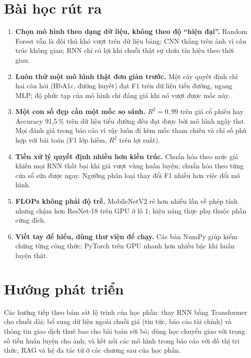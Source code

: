 \section*{Bài học rút ra}

\begin{enumerate}
  \item \textbf{Chọn mô hình theo dạng dữ liệu, không theo độ “hiện đại”.} Random Forest vẫn là đối thủ khó vượt trên dữ liệu
    bảng; CNN thắng trên ảnh vì cấu trúc không gian; RNN chỉ có lợi khi chuỗi thật sự chứa tín hiệu theo thời gian.
  \item \textbf{Luôn thử một mô hình thật đơn giản trước.} Một cây quyết định chỉ hai câu hỏi (HbA1c, đường huyết) đạt F1
     trên dữ liệu tiểu đường, ngang MLP; độ phức tạp của mô hình chỉ đáng giá khi nó vượt được mốc này.
  \item \textbf{Một con số đẹp cần một mốc so sánh.} $R^2 = 0{,}99$ trên giá cổ phiếu hay Accuracy 91,5\,\% trên dữ liệu tiểu
    đường đều đạt được bởi mô hình ngây thơ. Mọi đánh giá trong báo cáo vì vậy luôn đi kèm mốc tham chiếu và chỉ số phù hợp
    với bài toán (F1 lớp hiếm, $R^2$ trên lợi suất).
  \item \textbf{Tiền xử lý quyết định nhiều hơn kiến trúc.} Chuẩn hóa theo mức giá khiến mọi RNN thất bại khi giá vượt vùng
    huấn luyện; chuẩn hóa theo từng cửa sổ sửa được ngay. Ngưỡng phân loại thay đổi F1 nhiều hơn việc đổi mô hình.
  \item \textbf{FLOPs không phải độ trễ.} MobileNetV2 rẻ hơn nhiều lần về phép tính nhưng chậm hơn ResNet-18 trên GPU ở lô 1;
    hiệu năng thực phụ thuộc phần cứng đích.
  \item \textbf{Viết tay để hiểu, dùng thư viện để chạy.} Các bản NumPy giúp kiểm chứng từng công thức; PyTorch trên GPU nhanh
    hơn nhiều bậc khi huấn luyện thật.
\end{enumerate}

\section*{Hướng phát triển}

Các hướng tiếp theo bám sát lộ trình của học phần: thay RNN bằng Transformer cho chuỗi dài; bổ sung dữ liệu ngoài chuỗi giá
(tin tức, báo cáo tài chính) và thông tin giao dịch thuê bao cho bài toán rời bỏ; dùng học chuyển giao với trọng số tiền huấn
luyện cho ảnh; và kết nối các mô hình trong báo cáo với đồ thị tri thức, RAG và hệ đa tác tử ở các chương sau của học phần.
